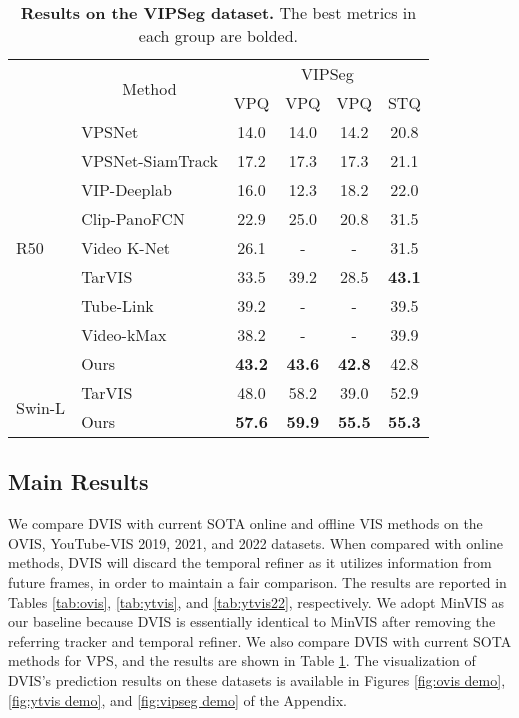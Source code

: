 \documentclass[10pt,twocolumn,letterpaper]{article}
\begin{document}
\begin{table}[t]
\centering
\setlength{\tabcolsep}{0.4mm}
\begin{tabular}{l|l|cccc}
	\multirow{2}{*}{} & \multicolumn{1}{c|}{\multirow{2}{*}{Method}} & \multicolumn{4}{c}{VIPSeg} \\
	~ & \multicolumn{1}{c|}{~} & VPQ &  VPQ & VPQ & STQ   \\
	\hline
	\multirow{9}{*}{R50} & VPSNet \cite{vpsnet}  & 14.0 & 14.0 & 14.2 & 20.8 \\
	~ & VPSNet-SiamTrack \cite{siamtrack} &  17.2 & 17.3 & 17.3 & 21.1 \\
	~ & VIP-Deeplab \cite{vipdeeplab} &  16.0 & 12.3 & 18.2 & 22.0 \\
	~ & Clip-PanoFCN \cite{clippanofcn} & 22.9 & 25.0 & 20.8 & 31.5 \\
	~ & Video K-Net \cite{videoknet} & 26.1 & - & - & 31.5 \\
	~ & TarVIS \cite{tarvis} & 33.5 & 39.2 & 28.5 & \textbf{43.1} \\
    ~ & Tube-Link \cite{tubelink} & 39.2 & - & - & 39.5 \\
    ~ & Video-kMax \cite{videokmax} & 38.2 & - & - & 39.9 \\
	~ & Ours & \textbf{43.2} & \textbf{43.6} & \textbf{42.8} & 42.8 \\
	\hline
	\multirow{2}{*}{Swin-L} & TarVIS \cite{tarvis} & 48.0 & 58.2 & 39.0 & 52.9 \\
	~ &  Ours & \textbf{57.6} & \textbf{59.9} & \textbf{55.5} & \textbf{55.3}\\
\hline
 \end{tabular}
 \caption{\textbf{Results on the VIPSeg dataset.} The best metrics in each group are bolded.}\vspace{-6mm}
 \label{tab:vipseg}
\end{table}












\subsection{Main Results}
We compare DVIS with current SOTA online and offline VIS methods on the OVIS, YouTube-VIS 2019, 2021, and 2022 datasets. When compared with online methods, DVIS will discard the temporal refiner as it utilizes information from future frames, in order to maintain a fair comparison. The results are reported in Tables \ref{tab:ovis}, \ref{tab:ytvis}, and \ref{tab:ytvis22}, respectively. We adopt MinVIS \cite{minvis} as our baseline because DVIS is essentially identical to MinVIS after removing the referring tracker and temporal refiner. We also compare DVIS with current SOTA methods for VPS, and the results are shown in Table \ref{tab:vipseg}. The visualization of DVIS's prediction results on these datasets is available in Figures \ref{fig:ovis demo}, \ref{fig:ytvis demo}, and \ref{fig:vipseg demo} of the Appendix.
\end{document}

